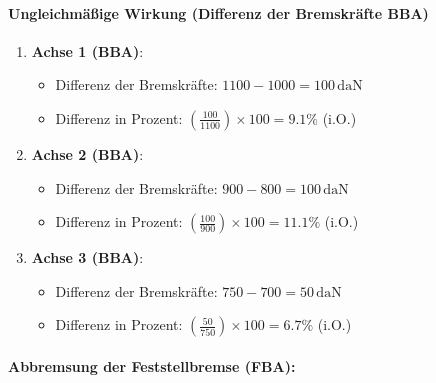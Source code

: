 \documentclass{vorlage-design-main}
\begin{document}
\paragraph{Ungleichmäßige Wirkung (Differenz der Bremskräfte
BBA)}\label{ungleichmaessige-wirkung-differenz-der-bremskraefte-bba}

\begin{enumerate}
\def\labelenumi{\arabic{enumi}.}

\item
  \textbf{Achse 1 (BBA)}:

  \begin{itemize}
  
  \item
    Differenz der Bremskräfte: $1100 - 1000 = 100 \, \text{daN}$
  \item
    Differenz in Prozent:
    $\left( \frac{100}{1100} \right) \times 100 = 9.1\%$ (i.O.)
  \end{itemize}
\item
  \textbf{Achse 2 (BBA)}:

  \begin{itemize}
  
  \item
    Differenz der Bremskräfte: $900 - 800 = 100 \, \text{daN}$
  \item
    Differenz in Prozent:
    $\left( \frac{100}{900} \right) \times 100 = 11.1\%$ (i.O.)
  \end{itemize}
\item
  \textbf{Achse 3 (BBA)}:

  \begin{itemize}
  
  \item
    Differenz der Bremskräfte: $750 - 700 = 50 \, \text{daN}$
  \item
    Differenz in Prozent:
    $\left( \frac{50}{750} \right) \times 100 = 6.7\%$ (i.O.)
  \end{itemize}
\end{enumerate}

\paragraph{Abbremsung der Feststellbremse
(FBA):}\label{abbremsung-der-feststellbremse-fba}
\end{document}
